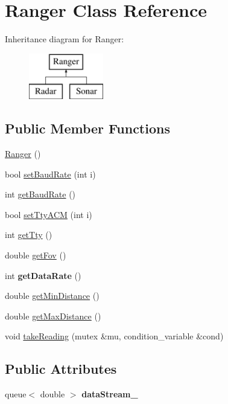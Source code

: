 \hypertarget{classRanger}{}\section{Ranger Class Reference}
\label{classRanger}
Inheritance diagram for Ranger\+:\begin{figure}[H]
\begin{center}
\leavevmode
\includegraphics[height=2.000000cm]{classRanger}
\end{center}
\end{figure}
\subsection*{Public Member Functions}
\begin{DoxyCompactItemize}
\item 
\hyperlink{classRanger_a65e1b9530f370b95cd673690c5bf02b5}{Ranger} ()
\item 
bool \hyperlink{classRanger_a5cb6fe854af1751438b1a836c6703f3f}{set\+Baud\+Rate} (int i)
\item 
int \hyperlink{classRanger_abd9461cf6b81f879986e6ef79a1a7269}{get\+Baud\+Rate} ()
\item 
bool \hyperlink{classRanger_af9e1edce24012a056905fe4e41eca784}{set\+Tty\+A\+CM} (int i)
\item 
int \hyperlink{classRanger_a10d0c5f291b2cd850e6d82717d1e179d}{get\+Tty} ()
\item 
double \hyperlink{classRanger_a92538e7e7c3b5346501ed4116b6a96bb}{get\+Fov} ()
\item 
int {\bfseries get\+Data\+Rate} ()\hypertarget{classRanger_a76768ed2f954887a5d4aa48271fdee3d}{}\label{classRanger_a76768ed2f954887a5d4aa48271fdee3d}

\item 
double \hyperlink{classRanger_ab08a6310dee156f89fdd28256b1055e5}{get\+Min\+Distance} ()
\item 
double \hyperlink{classRanger_a8e5aaf0373980c5196b171fe3371190c}{get\+Max\+Distance} ()
\item 
void \hyperlink{classRanger_af3c38e14a1cec55729563b5feebf1e6f}{take\+Reading} (mutex \&mu, condition\+\_\+variable \&cond)
\end{DoxyCompactItemize}
\subsection*{Public Attributes}
\begin{DoxyCompactItemize}
\item 
queue$<$ double $>$ {\bfseries data\+Stream\+\_\+}\hypertarget{classRanger_a82f7e4ae6cd80d31baf5118a3df877ab}{}\label{classRanger_a82f7e4ae6cd80d31baf5118a3df877ab}

\end{DoxyCompactItemize}
